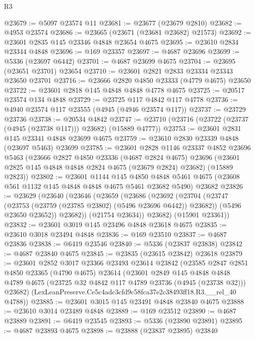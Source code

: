 \begin{lexlean}{R3}
\begin{coremodule}
@23679 := @5097 @23574 @11
@23681 := @23677 (@23679 @2810)
@23682 := @4953 @23574
@23686 := @23665 (@23671 (@23681 @23682) @21573)
@23692 := @23601 @2835 @145 @23346 @4848 @23654 @4675
@23695 := @23610 @2834 @23344 @4848
@23696 := @169 @23357
@23697 := @4687 @23696
@23699 := @5336 (@23697 @6442)
@23701 := @4687 @23699 @4675
@23704 := @23695 (@23651 @23701) @23654
@23710 := @23601 @2821 @2833 @23334 @23343 @23650 @23701
@23716 := @23666 @2820 @4850 @23333 (@4779 @4675) @23650
@23722 := @23601 @2818 @145 @4848 @4848 @4778 @4675
@23725 := @20517 @23574 @134 @4848
@23729 := @23725 @117 @4842 @117 @4778
@23736 := @4940 @23574 @117 @23555 (@4945 (@4946 @23574 @117))
@23737 := @23729 @23736
@23738 := @20534 @4842
@23747 := @23710 (@23716 (@23722 (@23737 (@4945 (@23738 @117))) @23682) (@15889 @4777))
@23753 := @23601 @2831 @145 @23341 @4848 @23699 @4675
@23759 := @23610 @2830 @23339 @4848 (@23697 @5463) @23699
@23785 := @23601
    @2828
    @1146
    @23337
    @4852
    @23696
    @5463
    (@23666
      @2827
      @4850
      @23336
      (@4687 @2824 @4675)
      @23696
      (@23601 @2825 @145 @4848 @4848 @2824 @4675 (@23679 @2824) @23682)
      (@15889 @2823))
@23802 := @23601
    @1144
    @145
    @4850
    @4848
    @5461
    @4675
    (@23608 @561 @1132 @145 @4848 @4848 @4675 @5461 @23682 @5490)
    @23682
@23826 := @23629
    (@23640
      (@23646
        (@23659
          (@23686
            (@23692
              (@23704
                (@23747 (@23753 (@23759 (@23785 @23802) (@5496 @23696 @6442)) @23682))
                (@5496 @23650 @23652))
              @23682))
          (@21754 @23634))
        @23682)
      (@15901 @23361))
@23832 := @23601 @3019 @145 @23496 @4848 @23618 @4675
@23835 := @23610 @3018 @23494 @4848
@23836 := @169 @23510
@23837 := @4687 @23836
@23838 := @6419 @23546
@23840 := @5336 (@23837 @23838)
@23842 := @4687 @23840 @4675
@23845 := @23835 (@23615 @23842) @23618
@23879 := @23601
    @2852
    @3017
    @23366
    @23493
    @23614
    @23842
    (@23585
      @2847
      @2851
      @4850
      @23365
      (@4790 @4675)
      @23614
      (@23601
        @2849
        @145
        @4848
        @4848
        @4789
        @4675
        (@23725 @32 @4842 @117 @4789 @23736 (@4945 (@23738 @32)))
        @23682)
      (LexLeanPreserve.Ce5c4adc3cfd9c58fca37e2c38493ff18.R3.__rel_40 @4788))
@23885 := @23601 @3015 @145 @23491 @4848 @23840 @4675
@23888 := @23610 @3014 @23489 @4848
@23889 := @169 @23512
@23890 := @4687 @23889
@23891 := @6419 @23545
@23893 := @5336 (@23890 @23891)
@23895 := @4687 @23893 @4675
@23898 := @23888 (@23837 @23895) @23840

\end{coremodule}
\end{lexlean}
